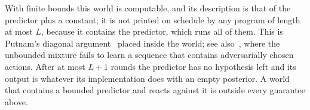 With finite bounds this world is computable, and its description is that of the predictor plus a constant; it
is not printed on schedule by any program of length at most $L$, because it contains the predictor, which runs
all of them. This is Putnam's diagonal argument~\cite{putnam63,legg06} placed inside the world; see
also~\cite{wyeth25}, where the unbounded mixture fails to learn a sequence that contains adversarially chosen
actions. After at most $L+1$ rounds
the predictor has no hypothesis left and its output is whatever its implementation does with an empty
posterior. A world that contains a bounded predictor and reacts against it is outside every guarantee above.
